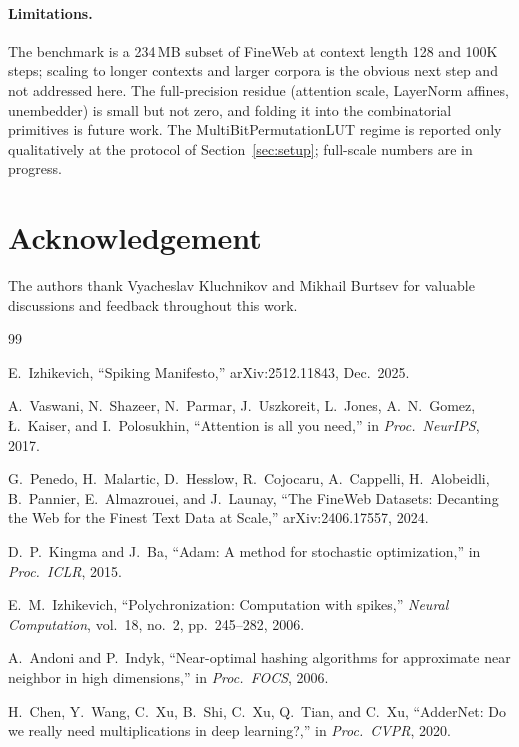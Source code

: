 \documentclass[11pt]{article}
\begin{document}
\paragraph{Limitations.}
The benchmark is a 234\,MB subset of FineWeb at context length 128 and 100K steps; scaling to longer contexts and larger corpora is the obvious next step and not addressed here.
The full-precision residue (attention scale, LayerNorm affines, unembedder) is small but not zero, and folding it into the combinatorial primitives is future work.
The MultiBitPermutationLUT regime is reported only qualitatively at the protocol of Section~\ref{sec:setup}; full-scale numbers are in progress.


\section*{Acknowledgement}

The authors thank Vyacheslav Kluchnikov and Mikhail Burtsev for valuable discussions and feedback throughout this work.


\begin{thebibliography}{99}

E.~Izhikevich, ``Spiking Manifesto,'' arXiv:2512.11843, Dec.~2025.

A.~Vaswani, N.~Shazeer, N.~Parmar, J.~Uszkoreit, L.~Jones, A.~N.~Gomez, \L.~Kaiser, and I.~Polosukhin,
``Attention is all you need,'' in \emph{Proc.\ NeurIPS}, 2017.

G.~Penedo, H.~Malartic, D.~Hesslow, R.~Cojocaru, A.~Cappelli, H.~Alobeidli, B.~Pannier, E.~Almazrouei, and J.~Launay,
``The FineWeb Datasets: Decanting the Web for the Finest Text Data at Scale,'' arXiv:2406.17557, 2024.

D.~P.~Kingma and J.~Ba, ``Adam: A method for stochastic optimization,'' in \emph{Proc.\ ICLR}, 2015.

E.~M.~Izhikevich, ``Polychronization: Computation with spikes,'' \emph{Neural Computation}, vol.~18, no.~2, pp.~245--282, 2006.

A.~Andoni and P.~Indyk, ``Near-optimal hashing algorithms for approximate near neighbor in high dimensions,'' in \emph{Proc.\ FOCS}, 2006.

H.~Chen, Y.~Wang, C.~Xu, B.~Shi, C.~Xu, Q.~Tian, and C.~Xu,
``AdderNet: Do we really need multiplications in deep learning?,'' in \emph{Proc.\ CVPR}, 2020.

\end{thebibliography}
\end{document}

